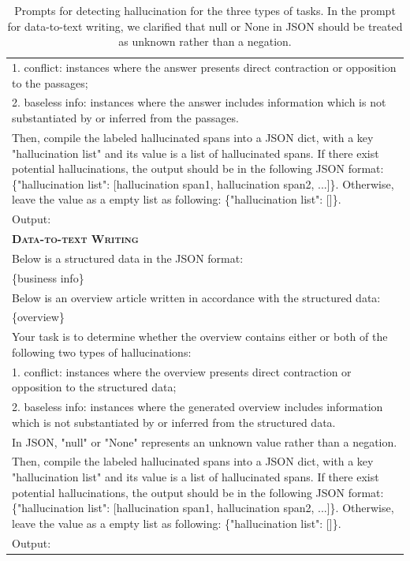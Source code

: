 \documentclass[11pt]{article}
\begin{document}
\begin{table}[!ht]
\begin{tabular}{p{}}
1. conflict: instances where the answer presents direct contraction or opposition to the passages;\\
2. baseless info: instances where the answer includes information which is not substantiated by or inferred from the passages.\\
Then, compile the labeled hallucinated spans into a JSON dict, with a key "hallucination list" and its value is a list of hallucinated spans. If there exist potential hallucinations, the output should be in the following JSON format: \{"hallucination list": [hallucination span1, hallucination span2, ...]\}. Otherwise, leave the value as a empty list as following: \{"hallucination list": []\}.\\
Output:\\
    
    \midrule
    \textbf{\textsc{Data-to-text Writing}}\\
    \midrule
Below is a structured data in the JSON format:\\
\{business info\}\\
Below is an overview article written in accordance with the structured data:\\
\{overview\}\\
Your task is to determine whether the overview contains either or both of the following two types of hallucinations: \\
1. conflict: instances where the overview presents direct contraction or opposition to the structured data;\\
2. baseless info: instances where the generated overview includes information which is not substantiated by or inferred from the structured data.\\
In JSON, "null" or "None" represents an unknown value rather than a negation. \\
Then, compile the labeled hallucinated spans into a JSON dict, with a key "hallucination list" and its value is a list of hallucinated spans. If there exist potential hallucinations, the output should be in the following JSON format: \{"hallucination list": [hallucination span1, hallucination span2, ...]\}. Otherwise, leave the value as a empty list as following: \{"hallucination list": []\}.\\
Output:\\
    \bottomrule
    \end{tabular}
    \caption{Prompts for detecting hallucination for the three types of tasks. In the prompt for data-to-text writing, we clarified that null or None in JSON should be treated as unknown rather than a negation.} 
    \label{tab:prompts}
\end{table}

\end{document}
